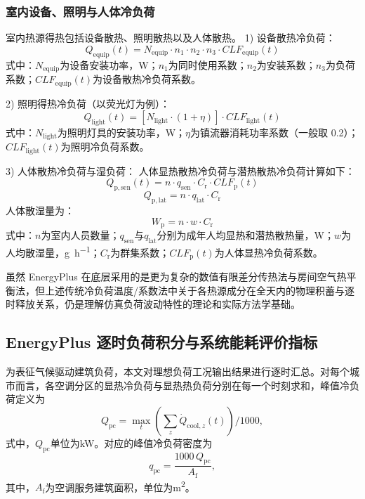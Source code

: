 \subsubsection{室内设备、照明与人体冷负荷}
室内热源得热包括设备散热、照明散热以及人体散热。
1) 设备散热冷负荷：
\begin{equation}
Q_{\mathrm{equip}}(t) = N_{\mathrm{equip}} \cdot n_1 \cdot n_2 \cdot n_3 \cdot CLF_{\mathrm{equip}}(t)
\end{equation}
式中：$N_{\mathrm{equip}}$为设备安装功率，\si{W}；$n_1$为同时使用系数；$n_2$为安装系数；$n_3$为负荷系数；$CLF_{\mathrm{equip}}(t)$为设备散热冷负荷系数。

2) 照明得热冷负荷（以荧光灯为例）：
\begin{equation}
Q_{\mathrm{light}}(t) = \left[ N_{\mathrm{light}} \cdot (1 + \eta) \right] \cdot CLF_{\mathrm{light}}(t)
\end{equation}
式中：$N_{\mathrm{light}}$为照明灯具的安装功率，\si{W}；$\eta$为镇流器消耗功率系数（一般取 0.2）；$CLF_{\mathrm{light}}(t)$为照明冷负荷系数。

3) 人体散热冷负荷与湿负荷：
人体显热散热冷负荷与潜热散热冷负荷计算如下：
\begin{equation}
Q_{\mathrm{p,sen}}(t) = n \cdot q_{\mathrm{sen}} \cdot C_{\mathrm{r}} \cdot CLF_{\mathrm{p}}(t)
\end{equation}
\begin{equation}
Q_{\mathrm{p,lat}} = n \cdot q_{\mathrm{lat}} \cdot C_{\mathrm{r}}
\end{equation}
人体散湿量为：
\begin{equation}
W_{\mathrm{p}} = n \cdot w \cdot C_{\mathrm{r}}
\end{equation}
式中：$n$为室内人员数量；$q_{\mathrm{sen}}$与$q_{\mathrm{lat}}$分别为成年人均显热和潜热散热量，\si{W}；$w$为人均散湿量，\si{g\per\hour}；$C_{\mathrm{r}}$为群集系数；$CLF_{\mathrm{p}}(t)$为人体显热冷负荷系数。

虽然 EnergyPlus 在底层采用的是更为复杂的数值有限差分传热法与房间空气热平衡法，但上述传统冷负荷温度/系数法中关于各热源成分在全天内的物理积蓄与逐时释放关系，仍是理解仿真负荷波动特性的理论和实际方法学基础。

\subsection{EnergyPlus 逐时负荷积分与系统能耗评价指标}

为表征气候驱动建筑负荷，本文对理想负荷工况输出结果进行逐时汇总。对每个城市而言，各空调分区的显热冷负荷与显热热负荷分别在每一个时刻求和，峰值冷负荷定义为
\begin{equation}
Q_{\mathrm{pc}} = \max_t \left( \sum_z \dot{Q}_{\mathrm{cool},z}(t) \right) / 1000,
\end{equation}
式中，$Q_{\mathrm{pc}}$单位为\si{kW}。对应的峰值冷负荷密度为
\begin{equation}
q_{\mathrm{pc}} = \frac{1000 \, Q_{\mathrm{pc}}}{A_{\mathrm{f}}},
\end{equation}
其中，$A_{\mathrm{f}}$为空调服务建筑面积，单位为\si{m^2}。


